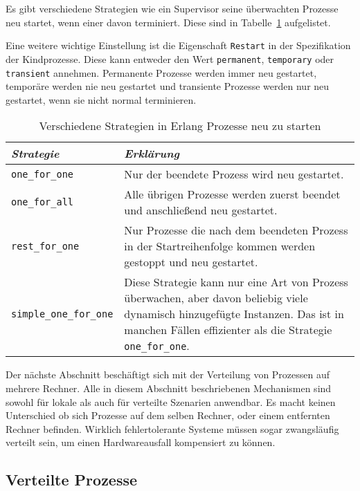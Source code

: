 Es gibt verschiedene Strategien wie ein Supervisor seine überwachten Prozesse neu startet, wenn einer davon terminiert. Diese sind in Tabelle~\ref{tab:erlang-restart-strategy} aufgelistet.

Eine weitere wichtige Einstellung ist die Eigenschaft \lstinline{Restart} in der Spezifikation der Kindprozesse. Diese kann entweder den Wert \lstinline{permanent}, \lstinline{temporary} oder \lstinline{transient} annehmen. Permanente Prozesse werden immer neu gestartet, temporäre werden nie neu gestartet und transiente Prozesse werden nur neu gestartet, wenn sie nicht normal terminieren.

\begin{table}[!hbt]
\caption{Verschiedene Strategien in Erlang Prozesse neu zu starten}
\label{tab:erlang-restart-strategy}
\centering
\begin{tabular}{|l|p{8cm}|}
\hline
\emph{Strategie} & \emph{Erklärung} \\
\hline
\lstinline$one_for_one$ & Nur der beendete Prozess wird neu gestartet. \\
\hline
\lstinline$one_for_all$ & Alle übrigen Prozesse werden zuerst beendet und anschließend neu gestartet. \\
\hline
\lstinline$rest_for_one$ & Nur Prozesse die nach dem beendeten Prozess in der Startreihenfolge kommen werden gestoppt und neu gestartet. \\
\hline
\lstinline$simple_one_for_one$ & Diese Strategie kann nur eine Art von Prozess überwachen, aber davon beliebig viele dynamisch hinzugefügte Instanzen. Das ist in manchen Fällen effizienter als die Strategie \lstinline$one_for_one$. \\
\hline
\end{tabular}
\end{table}

Der nächste Abschnitt beschäftigt sich mit der Verteilung von Prozessen auf mehrere Rechner. Alle in diesem Abschnitt beschriebenen Mechanismen sind sowohl für lokale als auch für verteilte Szenarien anwendbar. Es macht keinen Unterschied ob sich Prozesse auf dem selben Rechner, oder einem entfernten Rechner befinden. Wirklich fehlertolerante Systeme müssen sogar zwangsläufig verteilt sein, um einen Hardwareausfall kompensiert zu können.

\subsection{Verteilte Prozesse}

